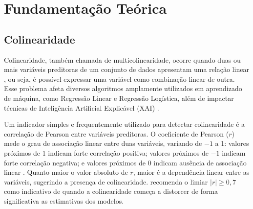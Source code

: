 
\chapter[Fundamentação Teórica]{Fundamentação Teórica}




\section{Colinearidade}\label{sec:colineariedade}

Colinearidade, também chamada de multicolinearidade, ocorre quando duas ou mais variáveis preditoras de um conjunto de dados apresentam uma relação linear \cite{Carsten2012Collinearity}, ou seja, é possível expressar uma variável como combinação linear de outra. Esse problema afeta diversos algoritmos amplamente utilizados em aprendizado de máquina, como Regressão Linear e Regressão Logística, além de impactar técnicas de Inteligência Artificial Explicável (XAI) \cite{salih2025a_perpective}.

Um indicador simples e frequentemente utilizado para detectar colinearidade é a correlação de Pearson entre variáveis preditoras. O coeficiente de Pearson ($r$) mede o grau de associação linear entre duas variáveis, variando de $-1$ a 1: valores próximos de 1 indicam forte correlação positiva; valores próximos de $-1$ indicam forte correlação negativa; e valores próximos de 0 indicam ausência de associação linear \cite{PearsonCorrelationCoefficient}. Quanto maior o valor absoluto de $r$, maior é a dependência linear entre as variáveis, sugerindo a presença de colinearidade.  recomenda o limiar $|r| \geq 0{,}7$ como indicativo de quando a colinearidade começa a distorcer de forma significativa as estimativas dos modelos.



